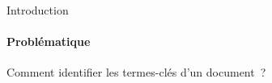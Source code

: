 \begin{frame}{Introduction}\framesubtitle{Problématique}
    Comment identifier les termes-clés d'un document~?
\end{frame}

